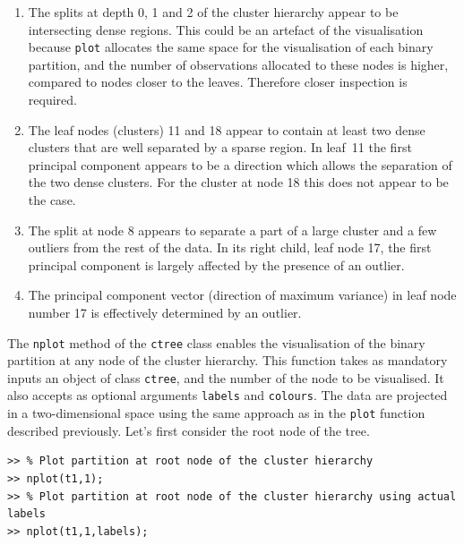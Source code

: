 \documentclass{book}
\begin{document}
\begin{enumerate}

\item The splits at depth 0, 1 and 2 of the cluster hierarchy appear to be
intersecting dense regions. This could be an artefact of the visualisation
because {\tt plot} allocates the same space for the visualisation of each
binary partition, and the number of observations allocated to these nodes is
higher, compared to nodes closer to the leaves.  Therefore closer inspection is
required.

\item The leaf nodes (clusters) 11 and 18 appear to contain at
least two dense clusters that are well separated by a sparse region. In leaf~11
the first principal component appears to be a direction which
allows the separation of the two dense clusters. For the cluster at node 18 this
does not appear to be the case.

\item The split at node 8 appears to separate a part of a large cluster and a
few outliers from the rest of the data. In its right child, leaf node 17, the
first principal component is largely affected by the presence of an outlier.

\item The principal component vector (direction of maximum variance) in leaf
node number 17 is effectively determined by an outlier.

\end{enumerate}


\noindent
%
The {\tt nplot} method of the {\tt ctree} class enables the visualisation of
the binary partition at any node of the cluster hierarchy. This function takes
as mandatory inputs an object of class {\tt ctree}, and the number of the node
to be visualised. It also accepts as optional arguments {\tt labels} and {\tt colours}.
The data are projected in a two-dimensional space using the same approach
as in the {\tt plot} function described previously.
%
Let's first consider the root node of the tree.


\begin{lstlisting}
>> % Plot partition at root node of the cluster hierarchy
>> nplot(t1,1); 
>> % Plot partition at root node of the cluster hierarchy using actual labels
>> nplot(t1,1,labels); 
\end{lstlisting}
\end{document}
